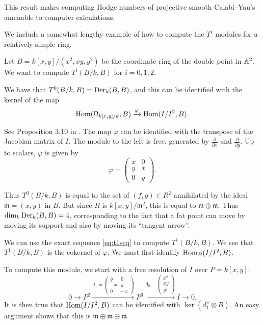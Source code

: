 This result makes computing Hodge numbers of projective smooth Calabi--Yau's amenable to computer calculations.

We include a somewhat lengthy example of how to compute the $T^i$ modules for a relatively simple ring.

\begin{example}
Let $B=k[x,y]/(x^2,xy,y^2)$ be the coordinate ring of the double point in $\mathbb{A}^2$. We want to compute $T^i(B/k,B)$ for $i=0,1,2$. 

We have that $T^0(B/k,B) = \operatorname{Der}_k(B,B)$, and this can be identified with the kernel of the map
$$
\operatorname{Hom}(\Omega_{k[x,y]/k},B) \xrightarrow{\varphi} \operatorname{Hom}(I/I^2,B).
$$

See Proposition 3.10 in \cite{hartshorne_deformations}. The map $\varphi$ can be identified with the transpose of the Jacobian matrix of $I$. The module to the left is free, generated by $\frac{\partial}{\partial x}$ and $\frac{\partial}{\partial y}$. Up to scalars, $\varphi$ is given by 
\[
\varphi = \begin{pmatrix}
x & 0 \\ y & x \\ 0 & y
\end{pmatrix}.
\]

Thus $T^0(B/k,B)$ is equal to the set of $(f,g) \in R^2$ annihilated by the ideal $\mathfrak m = (x,y)$ in $B$. But since $R$ is $k[x,y]/\mathfrak m^2$, this is equal to $\mathfrak m \oplus \mathfrak m$. Thus $\dim_k \operatorname{Der}_k(B,B) = 4$, corresponding to the fact that a fat point can move by moving its support and also by moving its ``tangent arrow''.

We can use the exact sequence \eqref{eq:t1seq} to compute $T^1(B/k,B)$. We see that $T^1(B/k,B)$ is the cokernel of $\varphi$. We must first identify $\operatorname{Hom}_B(I/I^2,B)$.

To compute this module, we start with a free resolution of $I$ over $P=k[x,y]$:
\[
0 \to 
P^2 \xrightarrow{d_1 = 
	\begin{pmatrix}
	y & 0 \\ -x & y \\ 0  & -x
	\end{pmatrix}
} P^3 \xrightarrow{ d_0 = 
	\begin{pmatrix}
	x^2 \\ xy \\ y^2
	\end{pmatrix}
} I \to 0.
\]
It is then true that $\operatorname{Hom}(I/I^2,B)$ can be identified with $\ker ( d_1^\vee \otimes B)$. An easy argument shows that this is $\mathfrak m \oplus \mathfrak m  \oplus \mathfrak m$.


\end{example}
